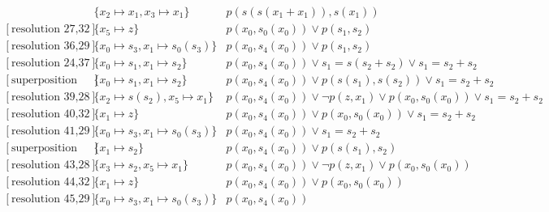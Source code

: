 \documentclass[onehalfspacing]{article}
\begin{document}
\begin{landscape}
\begin{align}
		[\text{forward demodulation 34,33}] &\{x_2\mapsto x_1, x_3\mapsto x_1\}&	 p(s(s(x_1 + x_1)),s(x_1)) \\
		[\text{resolution 27,32}] &\{x_5\mapsto z\}&	 p(x_0,s_0(x_0)) \vee p(s_1,s_2) \\
		[\text{resolution 36,29}] &\{x_0\mapsto s_3, x_1\mapsto s_0(s_3)\}&	 p(x_0, s_4(x_0))\vee p(s_1,s_2) \\
		[\text{resolution 24,37}] &\{x_0\mapsto s_1, x_1\mapsto s_2\}& 	p(x_0, s_4(x_0))\vee s_1 = s(s_2 + s_2) \vee s_1 = s_2 + s_2 \\
		[\text{superposition 25,38}] &\{x_0\mapsto s_1, x_1\mapsto s_2\}& 	 p(x_0, s_4(x_0))\vee p(s(s_1),s(s_2)) \vee s_1 = s_2 + s_2 \\
		[\text{resolution 39,28}] &\{x_2\mapsto s(s_2), x_5\mapsto x_1\}& 	 p(x_0, s_4(x_0))\vee \neg p(z,x_1) \vee p(x_0,s_0(x_0)) \vee s_1 = s_2 + s_2 \\
		[\text{resolution 40,32}] &\{x_1\mapsto z\}& 	 p(x_0, s_4(x_0))\vee p(x_0,s_0(x_0)) \vee s_1 = s_2 + s_2 \\
		[\text{resolution 41,29}] &\{x_0\mapsto s_3, x_1\mapsto s_0(s_3)\}& 	 p(x_0, s_4(x_0))\vee s_1 = s_2 + s_2 \\
		[\text{superposition 42,30}] &\{x_1\mapsto s_2\}& 	p(x_0, s_4(x_0))\vee p(s(s_1),s_2)\\
		[\text{resolution 43,28}] &\{x_3\mapsto s_2, x_5\mapsto x_1\}& 	 p(x_0, s_4(x_0))\vee\neg p(z,x_1) \vee p(x_0,s_0(x_0)) \\
		[\text{resolution 44,32}] &\{x_1\mapsto z\}& 	 p(x_0, s_4(x_0))\vee p(x_0,s_0(x_0)) \\
		[\text{resolution 45,29}] &\{x_0\mapsto s_3, x_1\mapsto s_0(s_3)\}& p(x_0, s_4(x_0))
	\end{align}
\end{landscape}
\end{document}
